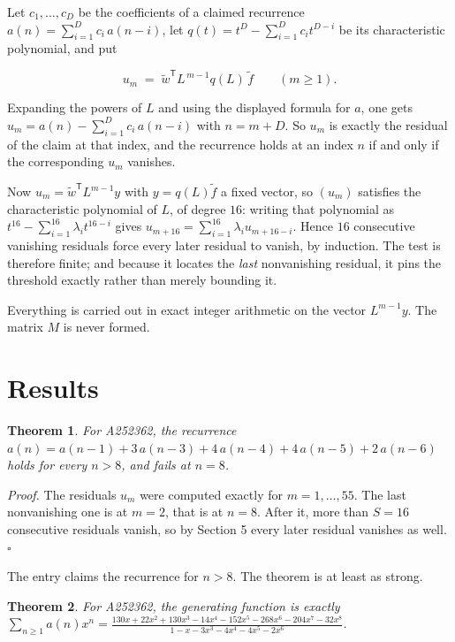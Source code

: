 \documentclass[11pt]{article}
\newtheorem{theorem}{Theorem}
\theoremstyle{definition}
\begin{document}
Let $c_1,\dots,c_D$ be the coefficients of a claimed recurrence $a(n) = \sum_{i=1}^{D} c_i\,a(n-i)$, let $q(t) = t^{D} - \sum_{i=1}^{D} c_i t^{D-i}$ be its characteristic polynomial, and put

\[u_m \;=\; \tilde w^{\mathsf T} L^{\,m-1} q(L)\,\tilde f \qquad (m \ge 1).\]

Expanding the powers of $L$ and using the displayed formula for $a$, one gets $u_m = a(n) - \sum_{i=1}^{D} c_i\,a(n-i)$ with $n = m + D$. So $u_m$ is exactly the residual of the claim at that index, and the recurrence holds at an index $n$ if and only if the corresponding $u_m$ vanishes.

Now $u_m = \tilde w^{\mathsf T} L^{m-1} y$ with $y = q(L)\tilde f$ a fixed vector, so $(u_m)$ satisfies the characteristic polynomial of $L$, of degree $16$: writing that polynomial as $t^{16} - \sum_{i=1}^{16} \lambda_i t^{16-i}$ gives $u_{m+16} = \sum_{i=1}^{16} \lambda_i u_{m+16-i}$. Hence $16$ consecutive vanishing residuals force every later residual to vanish, by induction. The test is therefore finite; and because it locates the {\itshape last} nonvanishing residual, it pins the threshold exactly rather than merely bounding it.

Everything is carried out in exact integer arithmetic on the vector $L^{m-1}y$. The matrix $M$ is never formed.

\section{Results}

\begin{theorem} For A252362, the recurrence $a(n) = a(n-1) + 3\,a(n-3) + 4\,a(n-4) + 4\,a(n-5) + 2\,a(n-6)$ holds for every $n > 8$, and fails at $n = 8$.\end{theorem}

{\itshape Proof.} The residuals $u_m$ were computed exactly for $m = 1,\dots,55$. The last nonvanishing one is at $m = 2$, that is at $n = 8$. After it, more than $S = 16$ consecutive residuals vanish, so by Section 5 every later residual vanishes as well. $\square$

The entry claims the recurrence for $n > 8$. The theorem is at least as strong.

\begin{theorem} For A252362, the generating function is exactly $\sum_{n\ge 1} a(n)x^n = \frac{130x + 22x^{2} + 130x^{3} - 14x^{4} - 152x^{5} - 268x^{6} - 204x^{7} - 32x^{8}}{1 - x - 3x^{3} - 4x^{4} - 4x^{5} - 2x^{6}}$.\end{theorem}
\end{document}
